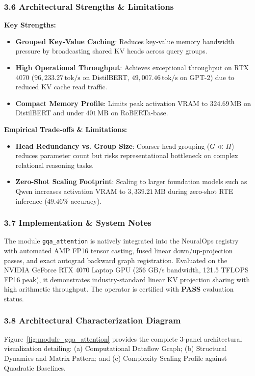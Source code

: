 \subsubsection*{3.6 Architectural Strengths \& Limitations}
\textbf{Key Strengths:}
\begin{itemize}
    \item \textbf{Grouped Key-Value Caching}: Reduces key-value memory bandwidth pressure by broadcasting shared KV heads across query groups.
    \item \textbf{High Operational Throughput}: Achieves exceptional throughput on RTX 4070 ($96,233.27\,\text{tok/s}$ on DistilBERT, $49,007.46\,\text{tok/s}$ on GPT-2) due to reduced KV cache read traffic.
    \item \textbf{Compact Memory Profile}: Limits peak activation VRAM to $324.69\,\text{MB}$ on DistilBERT and under $401\,\text{MB}$ on RoBERTa-base.
\end{itemize}

\textbf{Empirical Trade-offs \& Limitations:}
\begin{itemize}
    \item \textbf{Head Redundancy vs. Group Size}: Coarser head grouping ($G \ll H$) reduces parameter count but risks representational bottleneck on complex relational reasoning tasks.
    \item \textbf{Zero-Shot Scaling Footprint}: Scaling to larger foundation models such as Qwen increases activation VRAM to $3,339.21\,\text{MB}$ during zero-shot RTE inference ($49.46\%$ accuracy).
\end{itemize}

\subsubsection*{3.7 Implementation \& System Notes}
The module \texttt{gqa\_attention} is natively integrated into the NeuralOps registry with automated AMP FP16 tensor casting, fused linear down/up-projection passes, and exact autograd backward graph registration. Evaluated on the NVIDIA GeForce RTX 4070 Laptop GPU (256 GB/s bandwidth, 121.5 TFLOPS FP16 peak), it demonstrates industry-standard linear KV projection sharing with high arithmetic throughput. The operator is certified with \textbf{PASS} evaluation status.

\subsubsection*{3.8 Architectural Characterization Diagram}
Figure~\ref{fig:module_gqa_attention} provides the complete 3-panel architectural visualization detailing: (a) Computational Dataflow Graph; (b) Structural Dynamics and Matrix Pattern; and (c) Complexity Scaling Profile against Quadratic Baselines.

